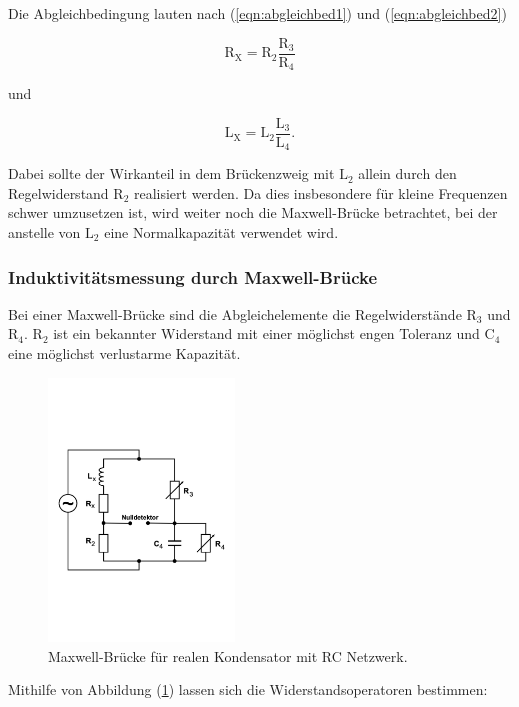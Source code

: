 \noindent
Die Abgleichbedingung lauten nach (\ref{eqn:abgleichbed1}) und (\ref{eqn:abgleichbed2})

\begin{equation}
\text{R}_\text{X} = \text{R}_2 \frac{\text{R}_3}{\text{R}_4}
\label{eqn:r_x}
\end{equation}

\noindent
und 

\begin{equation}
\text{L}_\text{X} = \text{L}_2 \frac{\text{L}_3}{\text{L}_4}  .
\label{eqn:c_x}
\end{equation}

\noindent
Dabei sollte der Wirkanteil in dem Brückenzweig mit $\text{L}_2$ allein durch den Regelwiderstand $\text{R}_2$ realisiert werden.
Da dies insbesondere für kleine Frequenzen schwer umzusetzen ist, wird weiter noch die Maxwell-Brücke betrachtet, 
bei der anstelle von $\text{L}_2$ eine Normalkapazität verwendet wird.

\subsubsection{Induktivitätsmessung durch Maxwell-Brücke}

\noindent
Bei einer Maxwell-Brücke sind die Abgleichelemente die Regelwiderstände $\text{R}_3$ und $\text{R}_4$.
$\text{R}_2$ ist ein bekannter Widerstand mit einer möglichst engen Toleranz und $\text{C}_4$ eine möglichst verlustarme Kapazität.

\begin{figure}
            \centering
               \includegraphics[height=7cm]{maxwell.pdf}
               \caption{Maxwell-Brücke für realen Kondensator mit RC Netzwerk.}
               \label{fig:max}
        \end{figure}
 
\noindent
Mithilfe von Abbildung (\ref{fig:max}) lassen sich die Widerstandsoperatoren bestimmen:

